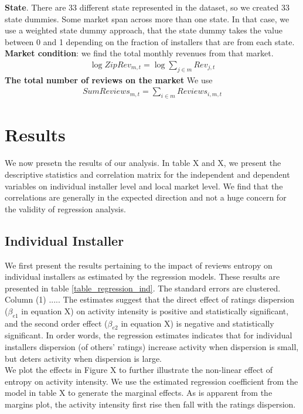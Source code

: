 \documentclass[msom,blindrev]{informs3}
\begin{document}
 \textbf{State}. There are 33 different state represented in the dataset, so we created 33 state dummies. Some market span across more than one state. In that case, we use a weighted state dummy approach, that the state dummy takes the value between 0 and 1 depending on the fraction of installers that are from each state. \\
  \textbf{Market condition}: 
we find the total monthly revenues from that market. 
\begin{align*}
\log ZipRev_{m,t}=\log \sum_{j\in m}Rev_{j,t}
\end{align*}
 \textbf{The total number of reviews on the market } We use 
\begin{align*}
SumReviews_{m,t}=\sum_{i\in m} Reviews_{i,m,t}
\end{align*}


\section{Results}
We now presetn the results of our analysis. In table X and X, we present the descriptive statistics and correlation matrix for the independent and dependent variables on individual installer level and local market level. We find that the correlations are generally in the expected direction and not a huge concern for the validity of regression analysis. 

\subsection{Individual Installer}
We first present the results pertaining to the impact of reviews entropy on individual installers as estimated by the regression models. These results are presented in table \ref{table_regression_ind}.  The standard errors are clustered. Column (1) ..... The estimates suggest that the direct effect of ratings dispersion ($\beta_{e1}$ in equation X) on activity intensity is positive and statistically significant, and the second order effect ($\beta_{e2}$ in equation X) is negative and statistically significant. In order words, the regression estimates indicates that for individual installers dispersion (of others' ratings) increase activity when dispersion is small, but deters activity when dispersion is large.\\
We plot the effects in Figure X to further illustrate the non-linear effect of entropy on activity intensity. We use the estimated regression coefficient from the model in table X to generate the marginal effects. As is apparent from the margins plot, the activity intensity first rise then fall with the ratings dispersion. 
\end{document}
